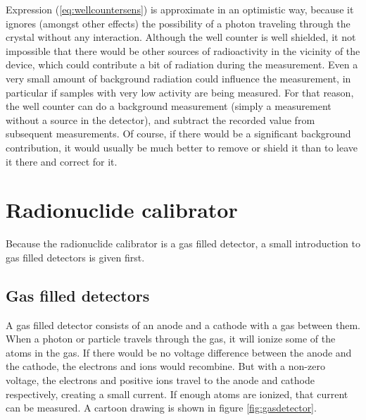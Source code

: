 \documentclass[11pt,oneside]{book}
\begin{document}
Expression (\ref{eq:wellcountersens}) is approximate in an optimistic
way, because it ignores (amongst other effects) the possibility of a
photon traveling through the crystal without any interaction.
Although the well counter is well shielded, it not impossible that
there would be other sources of radioactivity in the vicinity of the
device, which could contribute a bit of radiation during the
measurement. Even a very small amount of background radiation could
influence the measurement, in particular if samples with very low
activity are being measured. For that reason, the well counter can do
a background measurement (simply a measurement without a source in the
detector), and subtract the recorded value from subsequent
measurements. Of course, if there would be a significant background
contribution, it would usually be much better to remove or shield it
than to leave it there and correct for it.

\section{Radionuclide calibrator}
Because the radionuclide calibrator is a gas filled detector, a small introduction
to gas filled detectors is given first.

\subsection{Gas filled detectors}
A gas filled detector consists of an anode and a cathode with a gas
between them. When a photon or particle travels through the gas, it
will ionize some of the atoms in the gas. If there would be no voltage
difference between the anode and the cathode, the electrons and ions
would recombine. But with a non-zero voltage, the electrons and
positive ions travel to the anode and cathode respectively, creating
a small current. If enough atoms are ionized, that current can be
measured. A cartoon drawing is shown in figure \ref{fig:gasdetector}.
\end{document}
